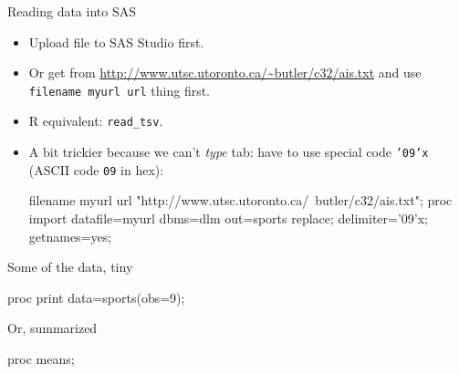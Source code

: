 \documentclass[unknownkeysallowed]{beamer}\usepackage[]{graphicx}\usepackage[]{color}
\begin{document}
\begin{frame}[fragile]{Reading data into SAS}
  
  \begin{itemize}
    \item Upload file to SAS Studio first.
    \item Or get from
      \url{http://www.utsc.utoronto.ca/~butler/c32/ais.txt} and use
      \texttt{filename myurl url} thing first.
      
    \item R equivalent: \texttt{read\_tsv}.
  \item A bit trickier because we can't \emph{type} tab: have to use
    special code \texttt{'09'x} (ASCII code \texttt{09} in hex):
    
    \begin{Datastep}
filename myurl url 
  "http://www.utsc.utoronto.ca/~butler/c32/ais.txt";
proc import 
  datafile=myurl
  dbms=dlm
  out=sports
  replace;
  delimiter='09'x;
  getnames=yes;

    \end{Datastep}
  \end{itemize}
  
\end{frame}

\begin{frame}[fragile]{Some of the data, tiny}
  
  \begin{Sascode}[store=ga]
proc print data=sports(obs=9);
  \end{Sascode}
  
  
\end{frame}

\begin{frame}[fragile]{Or, summarized}
  
  \begin{Sascode}[store=gb]
proc means;    
  \end{Sascode}
  
  
\end{frame}
\end{document}
